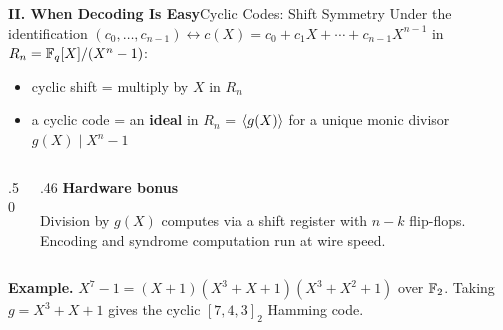 
\begin{frame}{\textbf{II. When Decoding Is Easy}}{Cyclic Codes: Shift Symmetry}
\small
{}
Under the identification $(c_0,\ldots,c_{n-1})\leftrightarrow c(X)=c_0+c_1X+\cdots+c_{n-1}X^{n-1}$
in $R_n=\mathbb{F}_q[X]/(X^n-1)$:
\begin{itemize}
  \item cyclic shift = multiply by $X$ in $R_n$
  \item a cyclic code = an \textbf{ideal} in $R_n$ = $\left\langle g(X)\right\rangle$ for a unique monic divisor $g(X)\mid X^n-1$
\end{itemize}
\begin{columns}[T,onlytextwidth]
\begin{column}{.50\textwidth}
\end{column}
\begin{column}{.46\textwidth}
\textcolor{TealDarkCyan}{\textbf{Hardware bonus}}

Division by $g(X)$ computes via a shift register with $n-k$ flip-flops.
Encoding and syndrome computation run at wire speed.
\end{column}
\end{columns}
\textbf{Example.}\; $X^7-1=(X+1)(X^3+X+1)(X^3+X^2+1)$ over $\mathbb{F}_2$.
Taking $g=X^3+X+1$ gives the cyclic $[7,4,3]_2$ Hamming code.
\end{frame}

